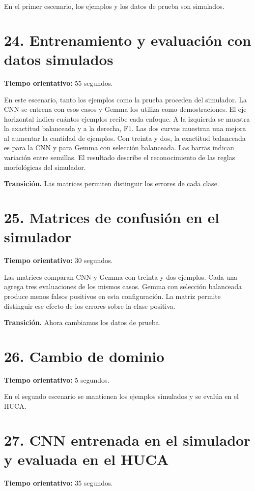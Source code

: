 \documentclass[11pt,a4paper]{article}
\begin{document}
En el primer escenario, los ejemplos y los datos de prueba son simulados.

\section*{24. Entrenamiento y evaluación con datos simulados}
\textbf{Tiempo orientativo: }55 segundos.

En este escenario, tanto los ejemplos como la prueba proceden del simulador. La CNN se entrena con esos casos y Gemma los utiliza como demostraciones. El eje horizontal indica cuántos ejemplos recibe cada enfoque. A la izquierda se muestra la exactitud balanceada y a la derecha, F1. Las dos curvas muestran una mejora al aumentar la cantidad de ejemplos. Con treinta y dos, la exactitud balanceada es \SimCnnBA{} para la CNN y \SimVlmBA{} para Gemma con selección balanceada. Las barras indican variación entre semillas. El resultado describe el reconocimiento de las reglas morfológicas del simulador.

\textbf{Transición.} Las matrices permiten distinguir los errores de cada clase.

\section*{25. Matrices de confusión en el simulador}
\textbf{Tiempo orientativo: }30 segundos.

Las matrices comparan CNN y Gemma con treinta y dos ejemplos. Cada una agrega tres evaluaciones de los mismos casos. Gemma con selección balanceada produce menos falsos positivos en esta configuración. La matriz permite distinguir ese efecto de los errores sobre la clase positiva.

\textbf{Transición.} Ahora cambiamos los datos de prueba.

\section*{26. Cambio de dominio}
\textbf{Tiempo orientativo: }5 segundos.

En el segundo escenario se mantienen los ejemplos simulados y se evalúa en el HUCA.

\section*{27. CNN entrenada en el simulador y evaluada en el HUCA}
\textbf{Tiempo orientativo: }35 segundos.
\end{document}

